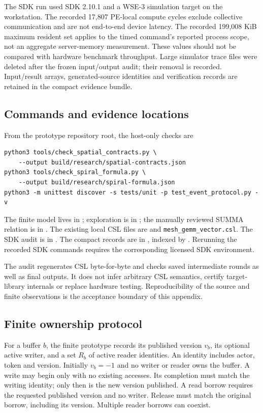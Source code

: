 \documentclass[final,3p,times,authoryear]{elsarticle}
\begin{document}
The SDK run used SDK 2.10.1 and a WSE-3 simulation target on the workstation. The recorded 17,807 PE-local compute cycles exclude collective communication and are not end-to-end device latency. The recorded 199,008 KiB maximum resident set applies to the timed command's reported process scope, not an aggregate server-memory measurement. These values should not be compared with hardware benchmark throughput. Large simulator trace files were deleted after the frozen input/output audit; their removal is recorded. Input/result arrays, generated-source identities and verification records are retained in the compact evidence bundle.

\subsection{Commands and evidence locations}
From the prototype repository root, the host-only checks are

\begin{lstlisting}[float=htbp,caption={Reproducing the finite models without a Cerebras SDK installation.}]
python3 tools/check_spatial_contracts.py \
    --output build/research/spatial-contracts.json
python3 tools/check_spiral_formula.py \
    --output build/research/spiral-formula.json
python3 -m unittest discover -s tests/unit -p test_event_protocol.py -v
\end{lstlisting}

The finite model lives in ; exploration is in ; the manually reviewed SUMMA relation is in . The existing local CSL files are  and \texttt{mesh\_gemm\_vector.csl}. The SDK audit is in . The compact records are in , indexed by . Rerunning the recorded SDK commands requires the corresponding licensed SDK environment.

The audit regenerates CSL byte-for-byte and checks saved intermediate rounds as well as final outputs. It does not infer arbitrary CSL semantics, certify target-library internals or replace hardware testing. Reproducibility of the source and finite observations is the acceptance boundary of this appendix.


\subsection{Finite ownership protocol}\label{app:protocol}
For a buffer $b$, the finite prototype records its published version $v_b$, its optional active writer, and a set $R_b$ of active reader identities. An identity includes actor, token and version. Initially $v_b=-1$ and no writer or reader owns the buffer. A write may begin only with no existing accesses. Its completion must match the writing identity; only then is the new version published. A read borrow requires the requested published version and no writer. Release must match the original borrow, including its version. Multiple reader borrows can coexist.
\end{document}
